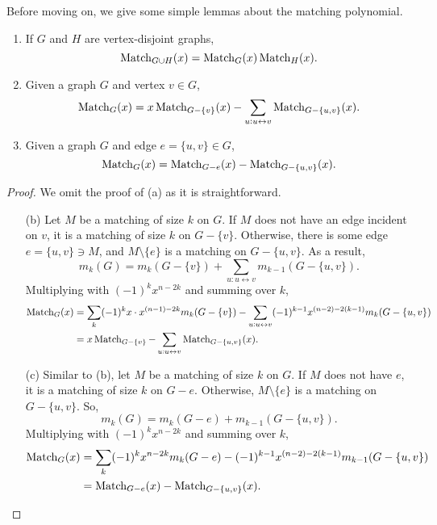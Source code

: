 	Before moving on, we give some simple lemmas about the matching polynomial.
	\begin{flem}
		\label{lem: matching polynomial basic results}
		\phantom{pain}
		\begin{enumerate}[label=(\alph*)]
			\item If $G$ and $H$ are vertex-disjoint graphs,
			\[ \operatorname{Match}_{G \cup H}(x) = \operatorname{Match}_G(x) \operatorname{Match}_H(x). \]
			\item Given a graph $G$ and vertex $v \in G$,
			\[ \operatorname{Match}_G(x) = x \operatorname{Match}_{G - \{v\}}(x) - \sum_{u : u \leftrightarrow v} \operatorname{Match}_{G - \{u,v\}} (x). \]
			\item Given a graph $G$ and edge $e = \{u,v\} \in G$,
			\[ \operatorname{Match}_G(x) = \operatorname{Match}_{G-e}(x) - \operatorname{Match}_{G-\{u,v\}}(x). \]
		\end{enumerate}
	\end{flem}
	\begin{proof}
		We omit the proof of (a) as it is straightforward.
		\begin{itemize}
			\item[(b)] Let $M$ be a matching of size $k$ on $G$. If $M$ does not have an edge incident on $v$, it is a matching of size $k$ on $G - \{v\}$. Otherwise, there is some edge $e = \{u,v\} \ni M$, and $M \setminus \{e\}$ is a matching on $G - \{u,v\}$. As a result,
			\[ m_k(G) = m_k(G- \{v\}) + \sum_{u : u \leftrightarrow v} m_{k-1}(G-\{u,v\}). \]
			Multiplying with $(-1)^k x^{n-2k}$ and summing over $k$,
			\begin{align*}
				\operatorname{Match}_G(x) &= \sum_k (-1)^k x \cdot x^{(n-1)-2k} m_k(G - \{v\}) - \sum_{u : u \leftrightarrow v} (-1)^{k-1} x^{(n-2)-2(k-1)} m_k(G - \{u,v\}) \\
					&= x\operatorname{Match}_{G-\{v\}} - \sum_{u : u \leftrightarrow v} \operatorname{Match}_{G - \{u,v\}} (x).
			\end{align*}
			\item[(c)] Similar to (b), let $M$ be a matching of size $k$ on $G$. If $M$ does not have $e$, it is a matching of size $k$ on $G - e$. Otherwise, $M \setminus \{e\}$ is a matching on $G - \{u,v\}$. So,
			\[ m_k(G) = m_k(G - e) + m_{k-1}(G - \{u,v\}). \]
			Multiplying with $(-1)^k x^{n-2k}$ and summing over $k$,
			\begin{align*}
				\operatorname{Match}_G(x) &= \sum_k (-1)^k x^{n-2k} m_k(G-e) - (-1)^{k-1} x^{(n-2)-2(k-1)} m_{k-1}(G-\{u,v\}) \\
					&= \operatorname{Match}_{G-e}(x) - \operatorname{Match}_{G-\{u,v\}}(x). \qedhere
			\end{align*}
		\end{itemize}
	\end{proof}


